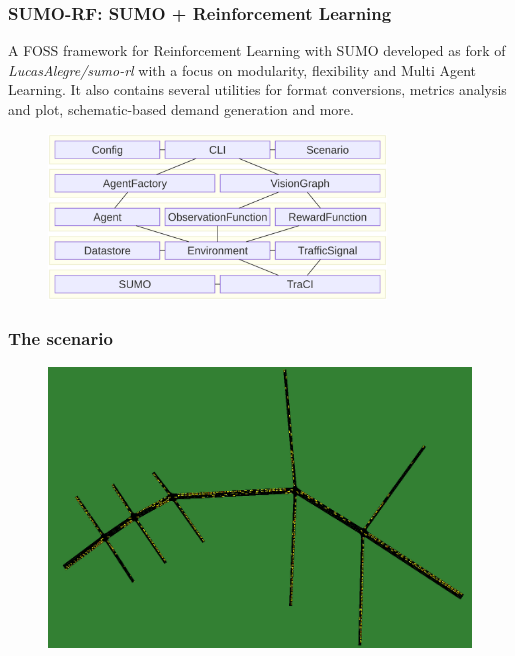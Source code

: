 \documentclass[dvipsnames]{beamer}
\begin{document}
\begin{frame}
\begin{columns}
\begin{column}{0.6\textwidth}
\begin{figure}
      \end{figure}
    \end{column}
  \end{columns}
\end{frame}

\begin{frame}
\frametitle{SUMO-RF: SUMO + Reinforcement Learning}
  A FOSS framework for Reinforcement Learning with SUMO developed as fork of \textit{LucasAlegre/sumo-rl} with a focus on modularity, flexibility and Multi Agent Learning.
  It also contains several utilities for format conversions, metrics analysis and plot, schematic-based demand generation and more.
  \begin{figure}
    \centering
    \includegraphics[width=0.8\textwidth]{figures/sumo-rf-architecture.png}
  \end{figure}
\end{frame}

\begin{frame}
\frametitle{The scenario}
  \begin{figure}
    \centering
    \includegraphics[width=1.0\textwidth]{figures/sumo-bassini.png}
  \end{figure}
\end{frame}
\end{document}
